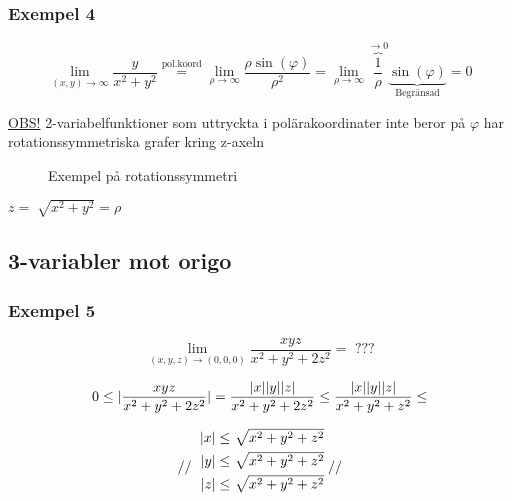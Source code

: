 \documentclass{article}
\DeclarePairedDelimiter \abs{\lvert}{\rvert}
\let\oldsqrt\sqrt
\renewcommand*{\sqrt}[2][\ ]{\oldsqrt[#1]{#2} }
\begin{document}
\newpage
\subsubsection{Exempel 4}

\begin{equation} \label{eq:2.4}
	\lim_{(x,y) \rightarrow \infty} \frac{y}{x^2+y^2} \overset{\mathrm{pol.koord}}{=} \lim_{\rho \rightarrow \infty} \frac{\rho \sin(\varphi)}{\rho^2} = 
	\lim_{\rho \rightarrow \infty} \overbrace{\frac{1}{\rho}}^{\rightarrow 0} \underbrace{\sin(\varphi)}_\text{Begränsad} = 0
\end{equation}

\underline{OBS!} 2-variabelfunktioner som uttryckta i polärakoordinater inte beror på $\varphi$ har rotationssymmetriska grafer kring z-axeln

\begin{figure}[ht]
\usetikzlibrary{3d}
\caption{Exempel på rotationssymmetri} \label{fig:2.3}
\end{figure}

\(
z = \sqrt{x^2+y^2} = \rho
\)

\subsection{3-variabler mot origo}
\subsubsection{Exempel 5} 

\begin{equation} \label{eq:2.5}
	\lim_{(x,y,z) \rightarrow (0,0,0)} \frac{xyz}{x^2+y^2+2z^2} = \text{ ???}
\end{equation}

\[
	0 \leq \abs{\frac{xyz}{x^2+y^2+2z^2}} = \frac{\abs{x}\abs{y}\abs{z}}{x^2+y^2+2z^2} \leq \frac{\abs{x}\abs{y}\abs{z}}{x^2+y^2+z^2} \leq 
\]

\[
	// 
	\def\arraystretch{1.1}
	\begin{blockarray}{r@{\;}l}
	\abs{x} \leq \sqrt{x^2+y^2+z^2} \\ [\jot]
	\abs{y} \leq \sqrt{x^2+y^2+z^2} \\ [\jot]
	\abs{z} \leq \sqrt{x^2+y^2+z^2}
	\end{blockarray}
	//
\]
\end{document}
